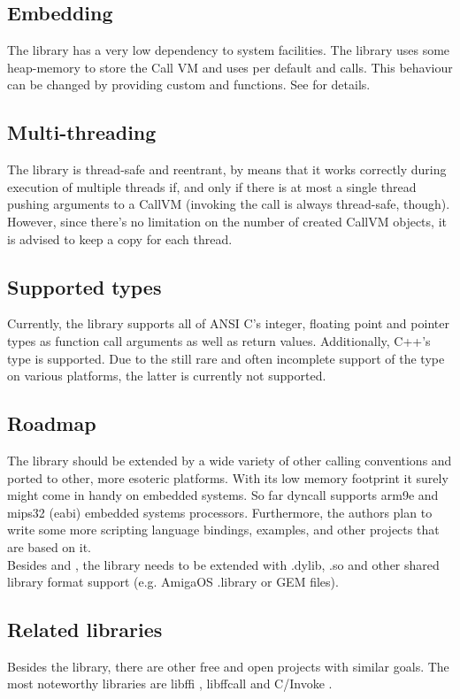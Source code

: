 \subsection{Embedding}

The  library has a very low dependency to system facilities.
The library uses some heap-memory to store the Call VM and uses per default
 and  calls. This behaviour can be changed by 
providing custom  and  functions.
See  for details.


\subsection{Multi-threading}

The  library is thread-safe and reentrant, by means that it
works correctly during execution of multiple threads if, and only if there is
at most a single thread pushing arguments to a CallVM (invoking the call is
always thread-safe, though). However, since there's no limitation on the
number of created CallVM objects, it is advised to keep a copy for each
thread.


\subsection{Supported types}

Currently, the  library supports all of ANSI C's integer,
floating point and pointer types as function call arguments as well as return
values. Additionally, C++'s  type is supported. Due to the still
rare and often incomplete support of the  type on various
platforms, the latter is currently not supported.


\subsection{Roadmap}

The  library should be extended by a wide variety of other
calling conventions and ported to other, more esoteric platforms. With its low
memory footprint it surely might come in handy on embedded systems. So far
dyncall supports arm9e and mips32 (eabi) embedded systems processors.
Furthermore, the authors plan to write some more scripting language bindings,
examples, and other projects that are based on it.\\
Besides  and , the 
library needs to be extended with .dylib, .so and other shared library format
support (e.g. AmigaOS .library or GEM \cite{.ldg} files).


\subsection{Related libraries}

Besides the  library, there are other free and open projects
with similar goals. The most noteworthy libraries are libffi \cite{libffi},
libffcall \cite{libffcall} and C/Invoke \cite{cinvoke}.
